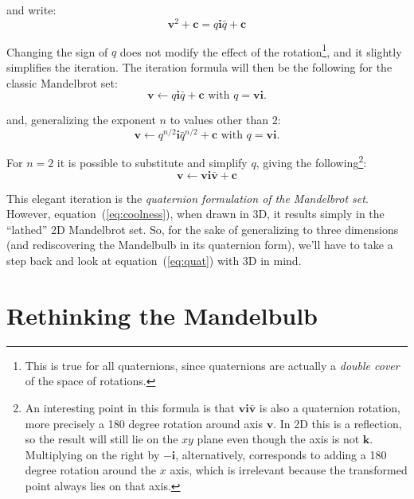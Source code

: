 \documentclass{article}
\let\vec\mathbf
\begin{document}
\noindent
and write:
\begin{equation*}
\vec{v}^2+\vec{c}=q \vec{i} \bar q+\vec{c}
\end{equation*}

\noindent
Changing the sign of $q$ does not modify the effect of the
rotation\footnote{This is true for all quaternions, since quaternions
  are actually a \emph{double cover} of the space of rotations.}, and
it slightly simplifies the iteration.  The iteration formula will then be
the following for the classic Mandelbrot set:
\begin{equation*}
\vec{v}\leftarrow q \vec{i} \bar q+\vec{c}\text{ with }q=\vec{v}\vec{i}.
\end{equation*}

\noindent
and, generalizing the exponent $n$ to values other than $2$:
\begin{equation}
\label{eq:quat}
\vec{v}\leftarrow q^{n/2} \vec{i} \bar q^{n/2}+\vec{c}\text{ with }q=\vec{v}\vec{i}.
\end{equation}

\noindent
For $n=2$ it is possible to substitute and simplify $q$, giving
the following\footnote{An interesting point in this formula is that
  $\vec{v}\vec{i}\vec{\bar v}$ is also a quaternion rotation, more
  precisely a 180 degree rotation around axis $\vec{v}$.  In 2D this
  is a reflection, so the result will still lie on the $xy$ plane
  even though the axis is not $\vec{k}$.  Multiplying on the right
  by $\vec{-i}$, alternatively, corresponds to adding a 180 degree
  rotation around the $x$ axis, which is irrelevant because the
  transformed point always lies on that axis.}:
\begin{equation}
\label{eq:coolness}
\vec{v}\leftarrow\vec{v} \vec{i} \vec{\bar v}+\vec{c}
\end{equation}

\noindent
This elegant iteration is the \emph{quaternion formulation of the
  Mandelbrot set}.  However, equation~(\ref{eq:coolness}), when
drawn in 3D, it results simply in the ``lathed'' 2D Mandelbrot set.  So,
for the sake of generalizing to three dimensions (and rediscovering the
Mandelbulb in its quaternion form), we'll have to take a step back and
look at equation~(\ref{eq:quat}) with 3D in mind.

\section{Rethinking the Mandelbulb}
\end{document}
